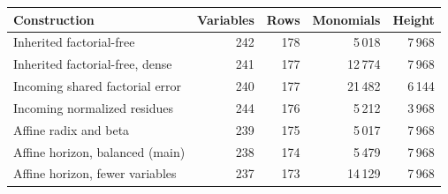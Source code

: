 \begin{center}\small
\begin{tabular}{@{}lrrrr@{}}
\toprule Construction & Variables & Rows & Monomials & Height \\
\midrule
Inherited factorial-free & 242 & 178 & 5\,018 & 7\,968 \\
Inherited factorial-free, dense & 241 & 177 & 12\,774 & 7\,968 \\
Incoming shared factorial error & 240 & 177 & 21\,482 & 6\,144 \\
Incoming normalized residues & 244 & 176 & 5\,212 & 3\,968 \\
\midrule
Affine radix and beta & 239 & 175 & 5\,017 & 7\,968 \\
Affine horizon, balanced (main) & 238 & 174 & 5\,479 & 7\,968 \\
Affine horizon, fewer variables & 237 & 173 & 14\,129 & 7\,968 \\
\bottomrule\end{tabular}\end{center}
